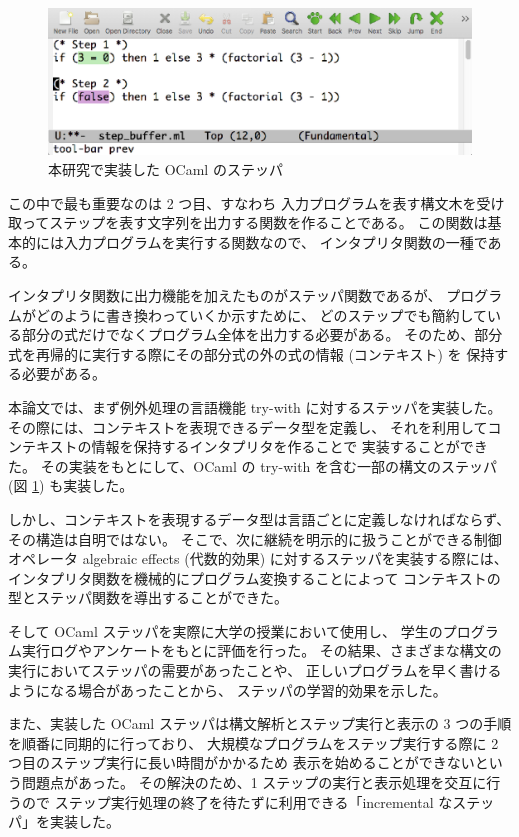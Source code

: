 \begin{figure}
\includegraphics[width=13cm]{1/ocamlfac.eps}
\caption{本研究で実装した OCaml のステッパ}
\label{figure:ocamlfac}
\end{figure}

この中で最も重要なのは 2 つ目、すなわち
入力プログラムを表す構文木を受け取ってステップを表す文字列を出力する関数を作ることである。
この関数は基本的には入力プログラムを実行する関数なので、
インタプリタ関数の一種である。

インタプリタ関数に出力機能を加えたものがステッパ関数であるが、
プログラムがどのように書き換わっていくか示すために、
どのステップでも簡約している部分の式だけでなくプログラム全体を出力する必要がある。
そのため、部分式を再帰的に実行する際にその部分式の外の式の情報 (コンテキスト) を
保持する必要がある。

本論文では、まず例外処理の言語機能 try-with に対するステッパを実装した。
その際には、コンテキストを表現できるデータ型を定義し、
それを利用してコンテキストの情報を保持するインタプリタを作ることで
実装することができた。
その実装をもとにして、OCaml の try-with を含む一部の構文のステッパ
(図 \ref{figure:ocamlfac}) も実装した。

しかし、コンテキストを表現するデータ型は言語ごとに定義しなければならず、
その構造は自明ではない。
そこで、次に継続を明示的に扱うことができる制御オペレータ
algebraic effects (代数的効果) に対するステッパを実装する際には、
インタプリタ関数を機械的にプログラム変換することによって
コンテキストの型とステッパ関数を導出することができた。

そして OCaml ステッパを実際に大学の授業において使用し、
学生のプログラム実行ログやアンケートをもとに評価を行った。
その結果、さまざまな構文の実行においてステッパの需要があったことや、
正しいプログラムを早く書けるようになる場合があったことから、
ステッパの学習的効果を示した。

また、実装した OCaml ステッパは構文解析とステップ実行と表示の
3 つの手順を順番に同期的に行っており、
大規模なプログラムをステップ実行する際に 2 つ目のステップ実行に長い時間がかかるため
表示を始めることができないという問題点があった。
その解決のため、1 ステップの実行と表示処理を交互に行うので
ステップ実行処理の終了を待たずに利用できる「incremental なステッパ」を実装した。

